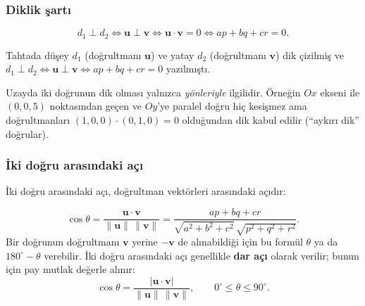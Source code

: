 \subsubsection{Diklik şartı}

\begin{teorem}
\[ d_1\perp d_2\iff \mathbf u\perp\mathbf v\iff \mathbf u\cdot\mathbf v=0\iff ap+bq+cr=0 . \]
\end{teorem}

\begin{tahta}
Tahtada düşey $d_1$ (doğrultmanı $\mathbf u$) ve yatay $d_2$ (doğrultmanı $\mathbf v$) dik çizilmiş ve
$d_1\perp d_2\iff\mathbf u\perp\mathbf v\iff ap+bq+cr=0$ yazılmıştı.
\end{tahta}

\begin{bilgi}
Uzayda iki doğrunun dik olması yalnızca \emph{yönleriyle} ilgilidir. Örneğin $Ox$ ekseni ile $(0,0,5)$ noktasından geçen ve $Oy$'ye paralel doğru hiç kesişmez ama doğrultmanları $(1,0,0)\cdot(0,1,0)=0$ olduğundan dik kabul edilir (``aykırı dik'' doğrular).
\end{bilgi}

\subsubsection{İki doğru arasındaki açı}

İki doğru arasındaki açı, doğrultman vektörleri arasındaki açıdır:
\begin{teorem}
\[ \cos\theta=\frac{\mathbf u\cdot\mathbf v}{\|\mathbf u\|\,\|\mathbf v\|}=\frac{ap+bq+cr}{\sqrt{a^2+b^2+c^2}\,\sqrt{p^2+q^2+r^2}} . \]
Bir doğrunun doğrultmanı $\mathbf v$ yerine $-\mathbf v$ de alınabildiği için bu formül $\theta$ ya da $180^\circ-\theta$ verebilir. İki doğru arasındaki açı genellikle \textbf{dar açı} olarak verilir; bunun için pay mutlak değerle alınır:
\[ \cos\theta=\frac{|\mathbf u\cdot\mathbf v|}{\|\mathbf u\|\,\|\mathbf v\|},\qquad 0^\circ\le\theta\le90^\circ . \]
\end{teorem}

